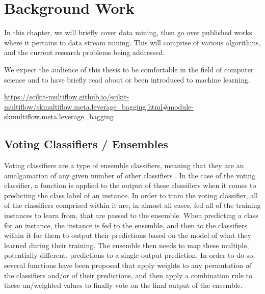 
\chapter{Background Work} %

\label{chapter:background_work} %
In this chapter, we will briefly cover data mining, then go over published works where it pertains to data stream mining. This will comprise of various algorithms, and the current research problems being addressed.

We expect the audience of this thesis to be comfortable in the field of computer science and to have briefly read about or been introduced to machine learning.


\cite{KRAWCZYK2017132} %

\url{https://scikit-multiflow.github.io/scikit-multiflow/skmultiflow.meta.leverage_bagging.html#module-skmultiflow.meta.leverage_bagging}


\section{Voting Classifiers / Ensembles\label{section:voting_ensemble}}
Voting classifiers are a type of ensemble classifiers, meaning that they are an amalgamation of any given number of other classifiers \cite{KRAWCZYK2017132,opitz1999popular,polikar2006ensemble,rokach2010ensemble}. In the case of the voting classifier, a function is applied to the output of these classifiers when it comes to predicting the class label of an instance. In order to train the voting classifier, all of the classifiers comprised within it are, in almost all cases, fed all of the training instances to learn from, that are passed to the ensemble. When predicting a class for an instance, the instance is fed to the ensemble, and then to the classifiers within it for them to output their predictions based on the model of what they learned during their training. The ensemble then needs to map these multiple, potentially different, predictions to a single output prediction. In order to do so, several functions have been proposed that apply weights to any permutation of the classifiers and/or of their predictions, and then apply a combination rule to these un/weighted values to finally vote on the final output of the ensemble.


